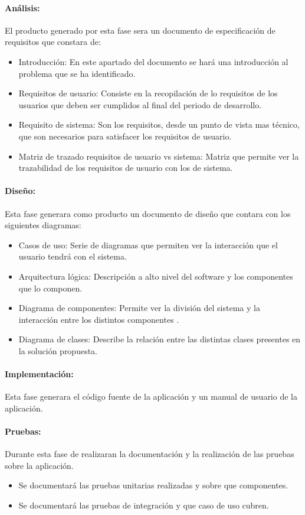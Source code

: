 \documentclass[11pt,letterpaper]{article}
\begin{document}
\paragraph{Análisis:} El producto generado por esta fase sera un documento de especificación de requisitos que constara de:
\begin{itemize}
	\item Introducción: En este apartado del documento se hará una introducción al problema que se ha identificado.
	\item Requisitos de usuario: Consiste en la recopilación de lo requisitos de los usuarios que deben ser cumplidos al final del periodo de desarrollo.
	\item Requisito de sistema: Son los requisitos, desde un punto de vista mas técnico, que son necesarios para satisfacer los requisitos de usuario.
	\item Matriz de trazado requisitos de usuario vs sistema: Matriz que permite ver la trazabilidad de los requisitos de usuario con los de sistema.
\end{itemize}
\paragraph{Diseño:} Esta fase generara como producto un documento de diseño que contara con los siguientes diagramas:
\begin{itemize}
	\item Casos de uso: Serie de diagramas que permiten ver la interacción que el usuario tendrá con el sistema.
	\item Arquitectura lógica: Descripción a alto nivel del software y los componentes que lo componen.
	\item Diagrama de componentes: Permite ver la división del sistema y la interacción entre los distintos componentes \cite{Bell2004}.
	\item Diagrama de clases: Describe la relación entre las distintas clases presentes en la solución propuesta.
\end{itemize}
\paragraph{Implementación:} Esta fase generara el código fuente de la aplicación y un manual de usuario de la aplicación.
\paragraph{Pruebas:} Durante esta fase de realizaran la documentación y la realización de las pruebas sobre la aplicación.
\begin{itemize}
	\item Se documentará las pruebas unitarias realizadas y sobre que componentes.
	\item Se documentará las pruebas de integración y que caso de uso cubren.
\end{itemize}
\end{document}
